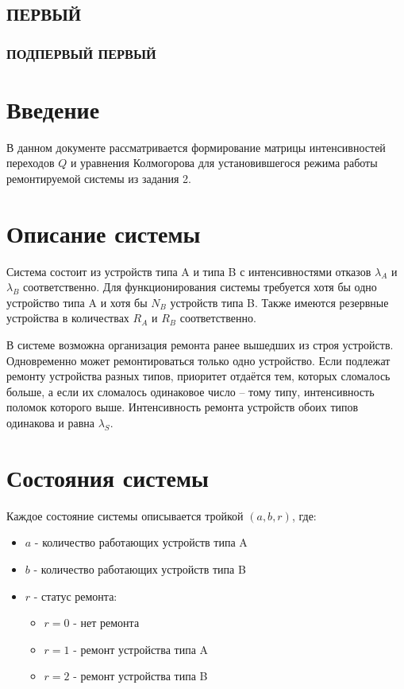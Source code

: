 \subsection{ПЕРВЫЙ}\label{sec:First}

\subsubsection{ПОДПЕРВЫЙ ПЕРВЫЙ}

\section{Введение}

В данном документе рассматривается формирование матрицы интенсивностей переходов $Q$ и уравнения Колмогорова для установившегося режима работы ремонтируемой системы из задания 2.

\section{Описание системы}

Система состоит из устройств типа A и типа B с интенсивностями отказов $\lambda_A$ и $\lambda_B$ соответственно. Для функционирования системы требуется хотя бы одно устройство типа A и хотя бы $N_B$ устройств типа B. Также имеются резервные устройства в количествах $R_A$ и $R_B$ соответственно.

В системе возможна организация ремонта ранее вышедших из строя устройств. Одновременно может ремонтироваться только одно устройство. Если подлежат ремонту устройства разных типов, приоритет отдаётся тем, которых сломалось больше, а если их сломалось одинаковое число – тому типу, интенсивность поломок которого выше. Интенсивность ремонта устройств обоих типов одинакова и равна $\lambda_S$.

\section{Состояния системы}

Каждое состояние системы описывается тройкой $(a, b, r)$, где:
\begin{itemize}
    \item $a$ - количество работающих устройств типа A
    \item $b$ - количество работающих устройств типа B
    \item $r$ - статус ремонта:
    \begin{itemize}
        \item $r = 0$ - нет ремонта
        \item $r = 1$ - ремонт устройства типа A
        \item $r = 2$ - ремонт устройства типа B
    \end{itemize}
\end{itemize}

